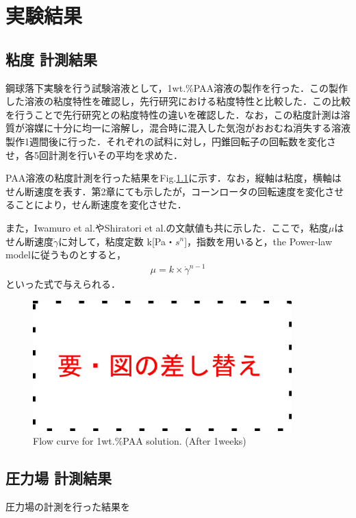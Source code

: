 \chapter{実験結果}
\section{粘度 計測結果}
鋼球落下実験を行う試験溶液として，1wt.\%PAA溶液の製作を行った．この製作した溶液の粘度特性を確認し，先行研究\cite{ref:9}\cite{ref:10}における粘度特性と比較した．この比較を行うことで先行研究との粘度特性の違いを確認した．なお，この粘度計測は溶質が溶媒に十分に均一に溶解し，混合時に混入した気泡がおおむね消失する溶液製作1週間後に行った．それぞれの試料に対し，円錐回転子の回転数を変化させ，各5回計測を行いその平均を求めた．

PAA溶液の粘度計測を行った結果をFig.\ref{fig:PAA-vis}に示す．なお，縦軸は粘度，横軸はせん断速度を表す．第2章にても示したが，コーンロータの回転速度を変化させることにより，せん断速度を変化させた．

また，Iwamuro et al.\cite{ref:9}やShiratori et al.\cite{ref:10}の文献値も共に示した．ここで，粘度$\mu$はせん断速度$\dot{\gamma}$に対して，粘度定数 k[Pa・$s^n$]，指数を用いると，the Power-law modelに従うものとすると，
\begin{eqnarray}
    \mu=k\times\dot{\gamma}^{n-1}
\end{eqnarray}
といった式で与えられる\cite{ref:1}．

\begin{figure}[h]
    \centering
    \includegraphics[width=10cm,clip]{tmp.png}
    \caption{Flow curve for 1wt.\%PAA solution. (After 1weeks)}
    \label{fig:PAA-vis}
\end{figure}

\section{圧力場 計測結果}

圧力場の計測を行った結果を

